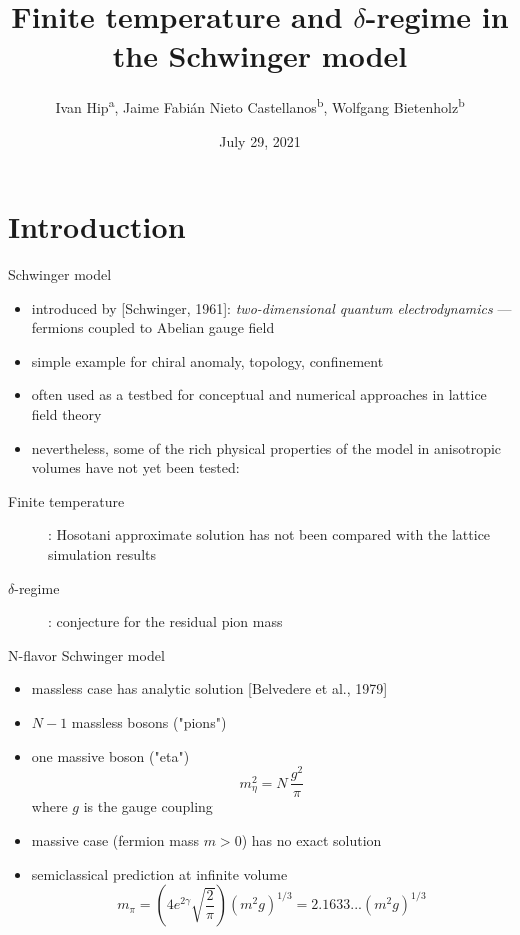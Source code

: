 \documentclass[english]{beamer}
\title{Finite temperature and $\delta$-regime in the Schwinger model}
\author{
  Ivan Hip\textsuperscript{a},
  Jaime Fabián Nieto Castellanos\textsuperscript{b},
  Wolfgang Bietenholz\textsuperscript{b}}
\institute{
  \textsuperscript{a}University of Zagreb, Croatia\\
  \textsuperscript{b}UNAM, Mexico
}
\date{July 29, 2021}
\begin{document}
 
\begin{frame}
  \titlepage
\end{frame}


\section{Introduction}

\begin{frame}{Schwinger model}
  \begin{itemize}
    \item introduced by [Schwinger, 1961]:
      \textit{two-dimensional quantum electrodynamics}
      --- fermions coupled to Abelian gauge field 
    \item simple example for chiral anomaly, topology, confinement
    \item often used as a testbed for conceptual and numerical
      approaches in lattice field theory
    \item nevertheless, some of the rich physical properties of
      the model in anisotropic volumes have not yet been tested:
  \end{itemize}
  \begin{description}
    \item[Finite temperature]:
      Hosotani approximate solution has not been compared with the lattice
      simulation results
    \item[$\delta$-regime]: conjecture for the residual pion mass
  \end{description}
\end{frame}

\begin{frame}{N-flavor Schwinger model}
  \begin{itemize}
    \item massless case has analytic solution
      [Belvedere et al., 1979]
    \item $N - 1$ massless bosons ("pions")
    \item one massive boson ("eta")
      \[
        m_\eta^2 = N\,\frac{g^2}{\pi}
      \]
      where $g$ is the gauge coupling
    \item massive case (fermion mass $m > 0$) has no exact solution
    \item semiclassical prediction at infinite volume
      \[
        m_\pi = \left(4e^{2\gamma}\sqrt{\frac{2}{\pi}}\right)
          (m^2 g)^{1/3} = 2.1633...(m^2 g)^{1/3}
      \]        
  \end{itemize}
\end{frame}
\end{document}
